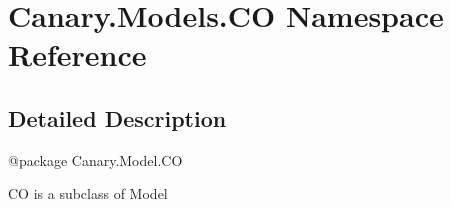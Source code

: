 \hypertarget{namespace_canary_1_1_models_1_1_c_o}{\section{Canary.\-Models.\-C\-O Namespace Reference}
\label{namespace_canary_1_1_models_1_1_c_o}
}


\subsection{Detailed Description}
\begin{DoxyVerb}@package Canary.Model.CO

CO is a subclass of Model
\end{DoxyVerb}
 